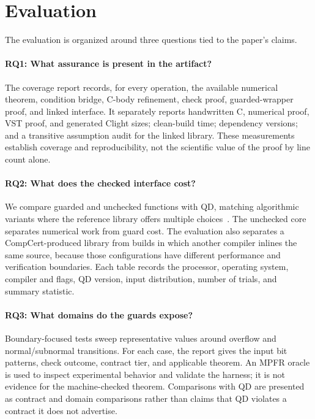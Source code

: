 \section{Evaluation}
\label{sec:evaluation}

The evaluation is organized around three questions tied to the paper's claims.

\paragraph{RQ1: What assurance is present in the artifact?}
The coverage report records, for every operation, the available numerical
theorem, condition bridge, C-body refinement, check proof, guarded-wrapper
proof, and linked interface.  It separately reports handwritten C, numerical
proof, VST proof, and generated Clight sizes; clean-build time; dependency
versions; and a transitive assumption audit for the linked library.  These
measurements establish coverage and reproducibility, not the scientific value
of the proof by line count alone.

\paragraph{RQ2: What does the checked interface cost?}
We compare guarded and unchecked functions with QD, matching algorithmic
variants where the reference library offers multiple choices~\cite{QD}.  The
unchecked core separates numerical work from guard cost.  The evaluation also
separates a CompCert-produced library from builds in which another compiler
inlines the same source, because those configurations have different
performance and verification boundaries.  Each table records the processor,
operating system, compiler and flags, QD version, input distribution, number of
trials, and summary statistic.

\paragraph{RQ3: What domains do the guards expose?}
Boundary-focused tests sweep representative values around overflow and
normal/subnormal transitions.  For each case, the report gives the input bit
patterns, check outcome, contract tier, and applicable theorem.  An MPFR oracle
is used to inspect experimental behavior and validate the harness; it is not
evidence for the machine-checked theorem.  Comparisons with QD are presented as
contract and domain comparisons rather than claims that QD violates a contract
it does not advertise.
